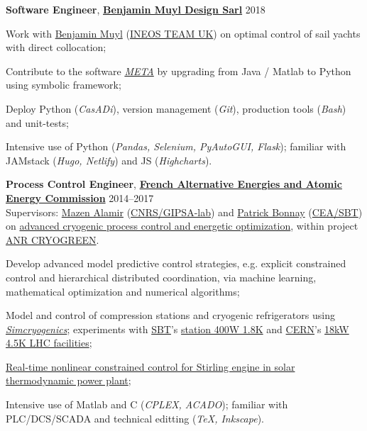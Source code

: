 \documentclass[a4paper,11pt]{article}
\begin{document}
	\vspace{0.1cm}
	
	\textbf{Software Engineer}, \href{https://www.bmuyl.com/}{\textbf{Benjamin Muyl Design Sarl}}
	\hfill {2018} 
	\begin{innerlist}
		\item Work with \href{https://www.linkedin.com/in/bmuyl/}{Benjamin Muyl}  (\href{https://www.ineosteamuk.com/}{INEOS TEAM UK}) on optimal control of sail yachts with direct collocation;
		\item Contribute to the software \href{https://pole-mer-bretagne-atlantique.com/en/component/projects/project/2235}{\emph{META}} by upgrading from Java / Matlab to Python using symbolic framework; 
		\item Deploy Python (\emph{CasADi}), version management (\emph{Git}), production tools (\emph{Bash}) and unit-tests;
		\item Intensive use of Python (\emph{Pandas, Selenium, PyAutoGUI, Flask}); familiar with JAMstack (\emph{Hugo, Netlify}) and JS (\emph{Highcharts}).
	\end{innerlist}
	
	\vspace{0.1cm}
	
	\textbf{Process Control Engineer}, \href{http://www.cea.fr/}{\textbf{French Alternative Energies and Atomic Energy Commission}} 
	\hfill {2014--2017} \\
	Supervisors: \href{http://www.mazenalamir.fr/home/}{Mazen Alamir} (\href{http://www.cnrs.fr/}{CNRS/GIPSA-lab}) and \href{https://www.researchgate.net/profile/P_Bonnay}{Patrick Bonnay} (\href{http://www.d-sbt.fr/en}{CEA/SBT}) on \href{https://vuongvtrinh.github.io/project/cryogenic-refrigerator/}{advanced cryogenic process control and energetic optimization}, within project \href{https://anr.fr/Project-ANR-13-SEED-0005}{ANR CRYOGREEN}.
	\begin{innerlist}
		\item Develop advanced model predictive control strategies, e.g. explicit constrained control and hierarchical distributed coordination, via machine learning, mathematical optimization and numerical algorithms;
		\item Model and control of compression stations and cryogenic refrigerators using \href{http://www.d-sbt.fr/en/Pages/News/2016_Francois-Bonne.aspx}{\emph{Simcryogenics}}; experiments with \href{http://www.d-sbt.fr/en}{SBT}'s \href{http://inac.cea.fr/en/Phocea/Vie_des_labos/Ast/ast_visu.php?id_ast=771}{station 400W 1.8K} and \href{https://cern.ch}{CERN}'s \href{https://cds.cern.ch/record/708291}{18kW 4.5K LHC facilities};
		\item \href{https://vuongvtrinh.github.io/project/solar-energy/}{Real-time nonlinear constrained control for Stirling engine in solar thermodynamic power plant};
		\item Intensive use of Matlab and C (\emph{CPLEX, ACADO}); familiar with PLC/DCS/SCADA and technical editting (\emph{TeX, Inkscape}).
	\end{innerlist}
	
\end{document}
